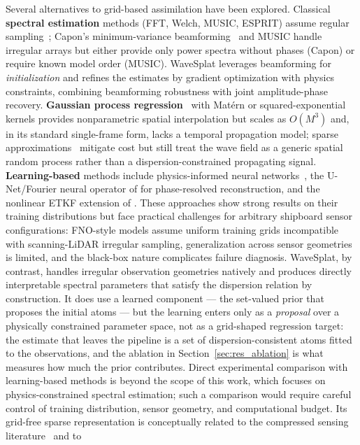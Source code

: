 \documentclass[review]{elsarticle}
\begin{document}
Several alternatives to grid-based assimilation have been explored.
Classical \textbf{spectral estimation} methods (FFT, Welch, MUSIC,
ESPRIT) assume regular sampling~\citep{young1994}; Capon's
minimum-variance beamforming~\citep{capon1969} and MUSIC
\citep{schmidt1986} handle irregular arrays but either provide only
power spectra without phases (Capon) or require known model order
(MUSIC).  WaveSplat leverages beamforming for \emph{initialization}
and refines the estimates by gradient optimization with physics
constraints, combining beamforming robustness with joint
amplitude-phase recovery.
\textbf{Gaussian process regression}~\citep{rasmussen2006} with
Mat\'ern or squared-exponential kernels provides nonparametric
spatial interpolation but scales as $O(M^3)$ and, in its standard
single-frame form, lacks a temporal propagation model; sparse
approximations~\citep{titsias2009} mitigate cost but still treat
the wave field as a generic spatial random process rather than a
dispersion-constrained propagating signal.
\textbf{Learning-based} methods include physics-informed neural
networks~\citep{liu2024, mohaghegh2021}, the U-Net/Fourier
neural operator of \citet{ehlers2024} for phase-resolved
reconstruction, and the nonlinear ETKF extension of
\citet{desmars2023jfm}.  These approaches show strong results on
their training distributions but face practical challenges for
arbitrary shipboard sensor configurations: FNO-style models assume
uniform training grids incompatible with scanning-LiDAR irregular
sampling, generalization across sensor geometries is limited, and
the black-box nature complicates failure diagnosis.
WaveSplat, by contrast, handles irregular observation geometries natively and
produces directly interpretable spectral parameters that satisfy the dispersion
relation by construction. It does use a learned component --- the set-valued
prior that proposes the initial atoms --- but the learning enters only as a
\emph{proposal} over a physically constrained parameter space, not as a
grid-shaped regression target: the estimate that leaves the pipeline is a set of
dispersion-consistent atoms fitted to the observations, and the ablation in
Section~\ref{sec:res_ablation} is what measures how much the prior contributes.
Direct experimental comparison with learning-based methods is beyond
the scope of this work, which focuses on physics-constrained spectral
estimation; such a comparison would require careful control of
training distribution, sensor geometry, and computational budget.
Its grid-free sparse representation is conceptually related to the
compressed sensing literature~\citep{candes2006, mallat1993} and to
\end{document}
